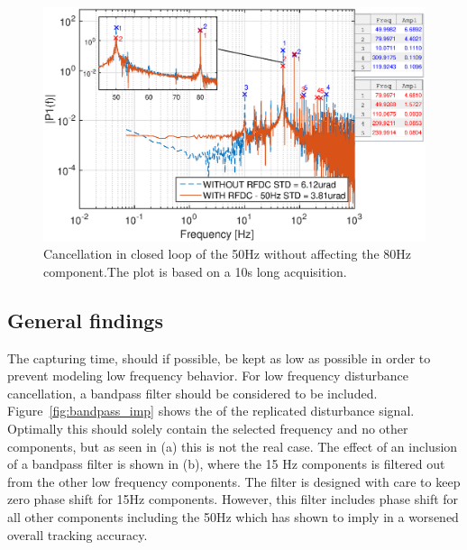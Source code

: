 \begin{figure}[h]
  \centering %
  \includegraphics[width=1\textwidth]{fig/matlab/mult_50_selected_closed_loop}
  \caption{\label{fig:mult50no80} Cancellation in closed loop of the 50Hz without affecting the 80Hz component.The plot is based on a 10s long acquisition.}
\end{figure}

\FloatBarrier
\subsection{General findings}\label{subsec:longterm}
The capturing time, should if possible, be kept as low as possible in order to prevent modeling low frequency behavior. For low frequency disturbance cancellation, a bandpass filter should be considered to be included. Figure~\ref{fig:bandpass_imp} shows the \abbrFFT of the replicated disturbance signal. Optimally this should solely contain the selected frequency and no other components, but as seen in (a) this is not the real case. The effect of an inclusion of a bandpass filter is shown in (b), where the 15 Hz components is filtered out from the other low frequency components. The filter is designed with care to keep zero phase shift for 15Hz components. However, this filter includes phase shift for all other components including the 50Hz which has shown to imply in a worsened overall tracking accuracy.

